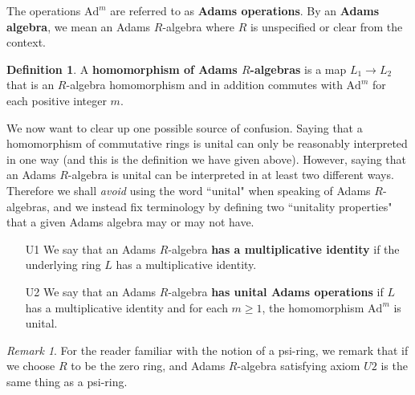 \documentclass[a4paper]{article}
\theoremstyle{definition}
\newtheorem{definition}{Definition}[section]
\theoremstyle{remark}
\newtheorem*{remark}{Remark}
\newcommand{\ad}[1]{\text{Ad}^{#1}}
\newcommand{\defhl}[1]{\textbf{#1}}
\begin{document}
The operations $\ad{m}$ are referred to as \defhl{Adams operations}. By an \defhl{Adams algebra}, we mean an Adams $R$-algebra where $R$ is unspecified or clear from the context.

\begin{definition}
A \defhl{homomorphism of Adams $R$-algebras} is a map $L_1 \to L_2$ that is an $R$-algebra homomorphism and in addition commutes with $\ad{m}$ for each positive integer $m$.
\end{definition}

We now want to clear up one possible source of confusion. Saying that a homomorphism of commutative rings is unital can only be reasonably interpreted in one way (and this is the definition we have given above). However, saying that an Adams $R$-algebra is unital can be interpreted in at least two different ways. Therefore we shall \emph{avoid} using the word ``unital" when speaking of Adams $R$-algebras, and we instead fix terminology by defining two ``unitality properties" that a given Adams algebra may or may not have.

\begin{itemize}
\item[U1] We say that an Adams $R$-algebra \defhl{has a multiplicative identity} if the underlying ring $L$ has a multiplicative identity.
\item[U2] We say that an Adams $R$-algebra \defhl{has unital Adams operations} if $L$ has a multiplicative identity and for each $m \geq 1$, the homomorphism $\ad{m}$ is unital.



\end{itemize}
\begin{remark}
For the reader familiar with the notion of a psi-ring, we remark that if we choose $R$ to be the zero ring, and Adams $R$-algebra satisfying axiom $U2$ is the same thing as a psi-ring.
\end{remark}
\end{document}
